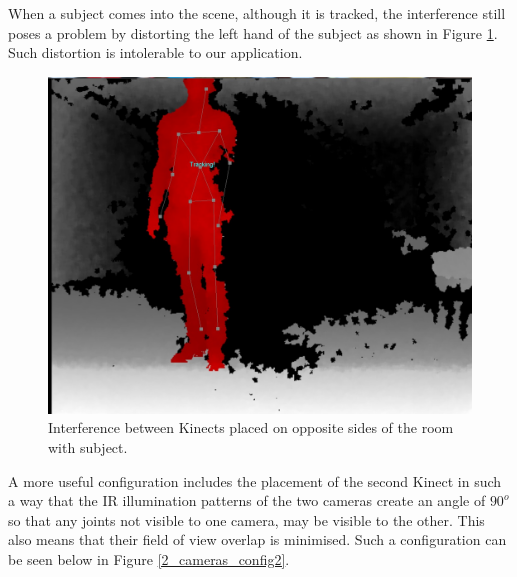 \documentclass[11pt,a4paper]{article}
\begin{document}
\noindent
When a subject comes into the scene, although it is tracked, the interference still poses a problem by distorting the left hand of the subject as shown in Figure \ref{IR_interference_w_subject}. Such distortion is intolerable to our application. 

\begin{figure}[H]
\centering
\includegraphics[scale=0.2]{IR_Interference3.jpg}
\caption{Interference between Kinects placed on opposite sides of the room with subject.}
\label{IR_interference_w_subject}
\end{figure}

\noindent
A more useful configuration includes the placement of the second Kinect in such a way that the IR illumination patterns of the two cameras create an angle of $90^o$ so that any joints not visible to one camera, may be visible to the other. This also means that their field of view overlap is minimised. Such a configuration can be seen below in Figure \ref{2_cameras_config2}.
\end{document}
